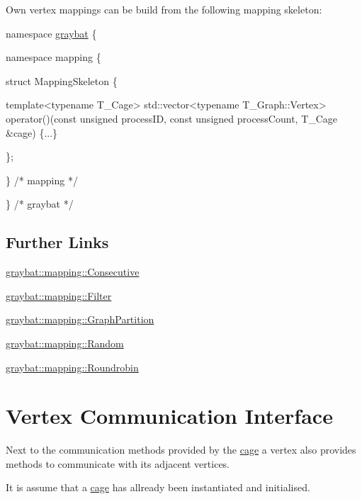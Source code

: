 Own vertex mappings can be build from the following mapping skeleton\+:


\begin{DoxyCode}
\textcolor{keyword}{namespace }\hyperlink{namespacegraybat}{graybat} \{

    \textcolor{keyword}{namespace }mapping \{

        \textcolor{keyword}{struct }MappingSkeleton \{

            \textcolor{keyword}{template}<\textcolor{keyword}{typename} T\_Cage>
            std::vector<typename T\_Graph::Vertex> operator()(\textcolor{keyword}{const} \textcolor{keywordtype}{unsigned} processID, \textcolor{keyword}{const} \textcolor{keywordtype}{unsigned} 
      processCount, T\_Cage &cage) \{...\}

        \};

    \} \textcolor{comment}{/* mapping */}

\} \textcolor{comment}{/* graybat */}
\end{DoxyCode}


\subsection*{Further Links}


\begin{DoxyItemize}
\item \hyperlink{structgraybat_1_1mapping_1_1Consecutive}{graybat\+::mapping\+::\+Consecutive}
\item \hyperlink{structgraybat_1_1mapping_1_1Filter}{graybat\+::mapping\+::\+Filter}
\item \hyperlink{structgraybat_1_1mapping_1_1GraphPartition}{graybat\+::mapping\+::\+Graph\+Partition}
\item \hyperlink{structgraybat_1_1mapping_1_1Random}{graybat\+::mapping\+::\+Random}
\item \hyperlink{structgraybat_1_1mapping_1_1Roundrobin}{graybat\+::mapping\+::\+Roundrobin} 
\end{DoxyItemize}\hypertarget{vertex}{}\section{Vertex Communication Interface}\label{vertex}
Next to the communication methods provided by the \hyperlink{cage}{cage} a vertex also provides methods to communicate with its adjacent vertices.

It is assume that a \hyperlink{cage}{cage} has allready been instantiated and initialised.


